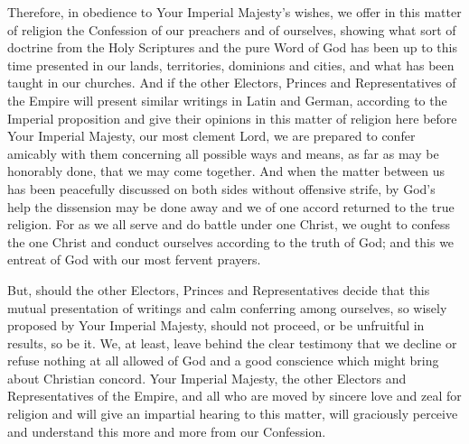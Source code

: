 Therefore, in obedience to Your Imperial Majesty’s wishes, we offer in this matter of religion the Confession of our preachers and of ourselves, showing what sort of doctrine from the Holy Scriptures and the pure Word of God has been up to this time presented in our lands, territories, dominions and cities, and what has been taught in our churches. And if the other Electors, Princes and Representatives of the Empire will present similar writings in Latin and German, according to the Imperial proposition and give their opinions in this matter of religion here before Your Imperial Majesty, our most clement Lord, we are prepared to confer amicably with them concerning all possible ways and means, as far as may be honorably done, that we may come together. And when the matter between us has been peacefully discussed on both sides without offensive strife, by God’s help the dissension may be done away and we of one accord returned to the true religion. For as we all serve and do battle under one Christ, we ought to confess the one Christ and conduct ourselves according to the truth of God; and this we entreat of God with our most fervent prayers.

But, should the other Electors, Princes and Representatives decide that this mutual presentation of writings and calm conferring among ourselves, so wisely proposed by Your Imperial Majesty, should not proceed, or be unfruitful in results, so be it. We, at least, leave behind the clear testimony that we decline or refuse nothing at all allowed of God and a good conscience which might bring about Christian concord. Your Imperial Majesty, the other Electors and Representatives of the Empire, and all who are moved by sincere love and zeal for religion and will give an impartial hearing to this matter, will graciously perceive and understand this more and more from our Confession.

